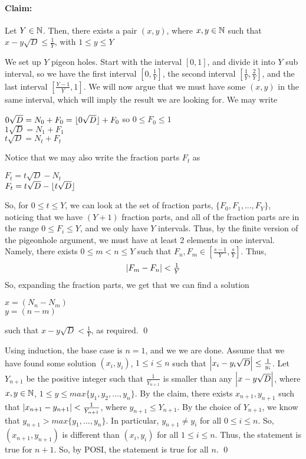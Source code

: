 \documentclass[../main.tex]{subfiles}
\begin{document}
\paragraph{Claim:} Let $Y \in \mathbb{N}$. Then, there exists a pair $(x,y)$, where $x,y \in \mathbb{N}$ such that $x-y\sqrt{D} \leq \tfrac{1}{Y}$, with $1 \leq y \leq Y$

\begin{pf}[of Claim]
    We set up $Y$ pigeon holes. Start with the interval $[0,1]$, and divide it into $Y$ sub interval, so we have the first interval $[0, \tfrac{1}{Y}]$, the second interval $[\tfrac{1}{Y}, \tfrac{2}{Y}]$, and the last interval $[\tfrac{Y-1}{Y}, 1]$. We will now argue that we must have some $(x,y)$ in the same interval, which will imply the result we are looking for. \sspace
    We may write 
    \begin{center}
        $0\sqrt{D} = N_0+F_0 = \lfloor0\sqrt{D}\rfloor+F_0$ so $0 \leq F_0 \leq 1$ \\
        $1\sqrt{D} = N_1+F_1$ \\
        $t\sqrt{D} = N_t+F_t$
    \end{center}
    Notice that we may also write the fraction parts $F_t$ as
    \begin{center}
        $F_t = t\sqrt{D}-N_t$ \\
        $F_t = t\sqrt{D}-\lfloor t\sqrt{D}\rfloor$
    \end{center}
    So, for $0 \leq t \leq Y$, we can look at the set of fraction parts, $\{F_0,F_1,...,F_Y\}$, noticing that we have $(Y+1)$ fraction parts, and all of the fraction parts are in the range $0 \leq F_i \leq Y$, and we only have $Y$ intervals. Thus, by the finite version of the pigeonhole argument, we must have at least 2 elements in one interval. Namely, there exists $0 \leq m < n \leq Y$ such that $F_n,F_m \in [\tfrac{s-1}{Y}, \tfrac{s}{Y}]$. Thus, $$\abs{F_m-F_n} < \tfrac{1}{Y}$$ So, expanding the fraction parts, we get that we can find a solution 
    \begin{center}
        $x=(N_n-N_m)$ \\
        $y=(n-m)$
    \end{center}
    such that $x-y\sqrt{D} < \tfrac{1}{Y}$, as required. \qed
\end{pf}
\begin{pf}[DDAT]
    Using induction, the base case is $n=1$, and we we are done. \sspace
    Assume that we have found some solution $(x_i,y_i)$, $1 \leq i \leq n$ such that $\abs{x_i-y_i\sqrt{D}} \leq \tfrac{1}{y_i}$. \sspace
    Let $Y_{n+1}$ be the positive integer such that $\tfrac{1}{Y_{n+1}}$ is smaller than any $\abs{x-y\sqrt{D}}$, where $x,y \in \mathbb{N}$, $1 \leq y \leq max\{y_1,y_2,...,y_n\}$. By the claim, there exists $x_{n+1},y_{n+1}$ such that $\abs{x_{n+1}-y_{n+1}} < \tfrac{1}{Y_{n+1}}$, where $y_{n+1} \leq Y_{n+1}$. By the choice of $Y_{n+1}$, we know that $y_{n+1} > max\{y_1,...,y_n\}$. In particular, $y_{n+1} \neq y_i$ for all $0 \leq i \leq n$. So, $(x_{n+1}, y_{n+1})$ is different than $(x_i,y_i)$ for all $1 \leq i \leq n$. \sspace
    Thus, the statement is true for $n+1$. So, by POSI, the statement is true for all $n$. \qed
\end{pf}
\end{document}

